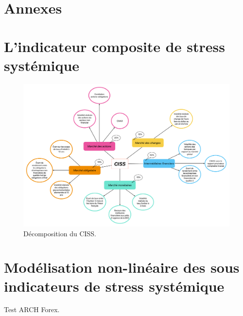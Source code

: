 \appendix \section*{Annexes}
\renewcommand{\thetable}{\thesection.\arabic{table}}
\renewcommand{\thefigure}{\thesection.\arabic{figure}}

\section{L'indicateur composite de stress systémique}
\setcounter{table}{0}
\setcounter{figure}{0}

\begin{figure}
    \centering
    \includegraphics[width=1\linewidth]{figures/décomposition du CISS.pdf}
    \caption{Décomposition du CISS.}
    \label{fig:decomposition_ciss}
\end{figure}

\newpage

\section{Modélisation non-linéaire des sous indicateurs de stress systémique}\label{appendix:resultats}
\setcounter{table}{0}
\setcounter{figure}{0}

\begin{table}[H]
    \centering
    \caption{Test ARCH Forex.}
    \sffamily
    
    \label{tab:arch_test_forex}
\end{table}

